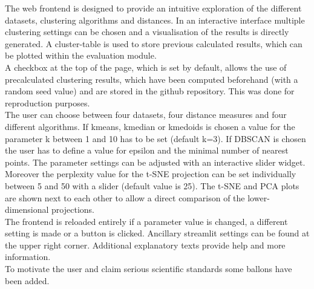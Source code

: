The web frontend is designed to provide an intuitive exploration of the different datasets, clustering algorithms and distances. In an interactive interface multiple clustering settings can be chosen and a visualisation of the results is directly generated. 
A cluster-table is used to store previous calculated results, which can be plotted within the evaluation module. \\
A checkbox at the top of the page, which is set by default, allows the use of precalculated clustering results, which have been computed beforehand (with a random seed value) and are stored in the github repository. This was done for reproduction purposes. \\
The user can choose between four datasets, four distance measures and four different algorithms. If kmeans, kmedian or kmedoids is chosen a value for the parameter k between 1 and 10 has to be set (default k=3). If DBSCAN is chosen the user has to define a value for epsilon and the minimal number of nearest points. The parameter settings can be adjusted with an interactive slider widget. \\
Moreover the perplexity value for the t-SNE projection can be set individually between 5 and 50 with a slider (default value is 25). The t-SNE and PCA plots are shown next to each other to allow a direct comparison of the lower-dimensional projections. \\
The frontend is reloaded entirely if a parameter value is changed, a different setting is made or a button is clicked. 
Ancillary streamlit settings can be found at the upper right corner. Additional explanatory texts provide help and more information. \\
To motivate the user and claim serious scientific standards some ballons have been added. 
